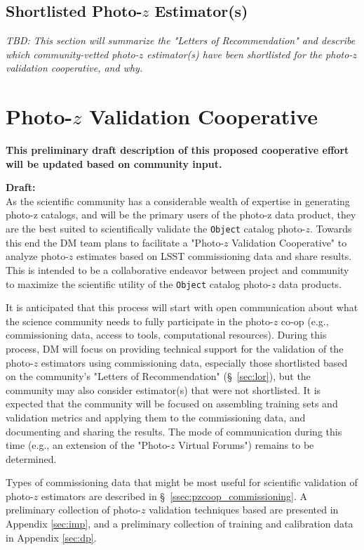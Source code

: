 \documentclass[DM,authoryear,toc]{lsstdoc}
\begin{document}
\begin{enumerate}
\subsection{Shortlisted Photo-$z$ Estimator(s)} \label{ssec:lor_choice}

\textit{TBD: This section will summarize the "Letters of Recommendation" and describe which community-vetted photo-$z$ estimator(s) have been shortlisted for the photo-$z$ validation cooperative, and why.}

\section{Photo-$z$ Validation Cooperative}\label{sec:pzcoop}

\textbf{This preliminary draft description of this proposed cooperative effort will be updated based on community input.}

\textbf{Draft:} \\
As the scientific community has a considerable wealth of expertise in generating photo-z catalogs, and will be the primary users of the photo-z data product, they are the best suited to scientifically validate the {\tt Object} catalog photo-$z$.
Towards this end the DM team plans to facilitate a "Photo-$z$ Validation Cooperative" to analyze photo-$z$ estimates based on LSST commissioning data and share results.
This is intended to be a collaborative endeavor between project and community to maximize the scientific utility of the {\tt Object} catalog photo-$z$ data products.

It is anticipated that this process will start with open communication about what the science community needs to fully participate in the photo-$z$ co-op (e.g., commissioning data, access to tools, computational resources).
During this process, DM will focus on providing technical support for the validation of the photo-$z$ estimators using commissioning data, especially those shortlisted based on the community's "Letters of Recommendation" (\S~\ref{sec:lor}), but the community may also consider estimator(s) that were not shortlisted.
It is expected that the community will be focused on assembling training sets and validation metrics and applying them to the commissioning data, and documenting and sharing the results.
The mode of communication during this time (e.g., an extension of the "Photo-$z$ Virtual Forums") remains to be determined.

Types of commissioning data that might be most useful for scientific validation of photo-$z$ estimators are described in \S~\ref{ssec:pzcoop_commissioning}.
A preliminary collection of photo-$z$ validation techniques based are presented in Appendix \ref{sec:imp}, and a preliminary collection of training and calibration data in Appendix \ref{sec:dp}.


\end{enumerate}
\end{document}
